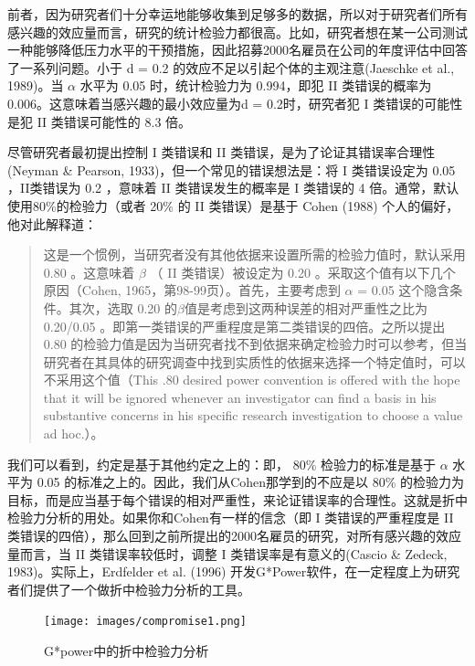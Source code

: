 \documentclass[
  letterpaper,
  DIV=11,
  numbers=noendperiod]{scrreprt}
\begin{document}
前者，因为研究者们十分幸运地能够收集到足够多的数据，所以对于研究者们所有感兴趣的效应量而言，研究的统计检验力都很高。比如，研究者想在某一公司测试一种能够降低压力水平的干预措施，因此招募2000名雇员在公司的年度评估中回答了一系列问题。小于
d = 0.2 的效应不足以引起个体的主观注意(Jaeschke et al., 1989)。当
\(\alpha\) 水平为 0.05 时，统计检验力为 0.994，即犯 II 类错误的概率为
0.006。这意味着当感兴趣的最小效应量为d = 0.2时，研究者犯 I
类错误的可能性是犯 II 类错误可能性的 8.3 倍。

尽管研究者最初提出控制 I 类错误和 II
类错误，是为了论证其错误率合理性(Neyman \& Pearson,
1933)，但一个常见的错误想法是：将 I 类错误设定为 0.05 ，II类错误为 0.2
，意味着 II 类错误发生的概率是 I 类错误的 4
倍。通常，默认使用80\%的检验力（或者 20\% 的 II 类错误）是基于 Cohen
(1988) 个人的偏好，他对此解释道：

\begin{quote}
这是一个惯例，当研究者没有其他依据来设置所需的检验力值时，默认采用 0.80
。这意味着 \(\beta\) （ II 类错误）被设定为 0.20
。采取这个值有以下几个原因（Cohen, 1965，第98-99页）。首先，主要考虑到
\(\alpha\) = 0.05 这个隐含条件。其次，选取 0.20
的\(\beta\)值是考虑到这两种误差的相对严重性之比为 0.20/0.05
。即第一类错误的严重程度是第二类错误的四倍。之所以提出 0.80
的检验力值是因为当研究者找不到依据来确定检验力时可以参考，但当研究者在其具体的研究调查中找到实质性的依据来选择一个特定值时，可以不采用这个值（This
.80 desired power convention is offered with the hope that it will be
ignored whenever an investigator can find a basis in his substantive
concerns in his specific research investigation to choose a value ad
hoc.）。
\end{quote}

我们可以看到，约定是基于其他约定之上的：即， 80\% 检验力的标准是基于
\(\alpha\) 水平为 0.05 的标准之上的。因此，我们从Cohen那学到的不应是以
80\%
的检验力为目标，而是应当基于每个错误的相对严重性，来论证错误率的合理性。这就是折中检验力分析的用处。如果你和Cohen有一样的信念（即
I 类错误的严重程度是 II
类错误的四倍），那么回到之前所提出的2000名雇员的研究，对所有感兴趣的效应量而言，当
II 类错误率较低时，调整 I 类错误率是有意义的(Cascio \& Zedeck,
1983)。实际上，Erdfelder et al. (1996)
开发G*Power软件，在一定程度上为研究者们提供了一个做折中检验力分析的工具。

\begin{figure}

{\centering \texttt{[image: images/compromise1.png]}

}

\caption{\label{fig-gpowcompromise}G*power中的折中检验力分析}

\end{figure}
\end{document}
